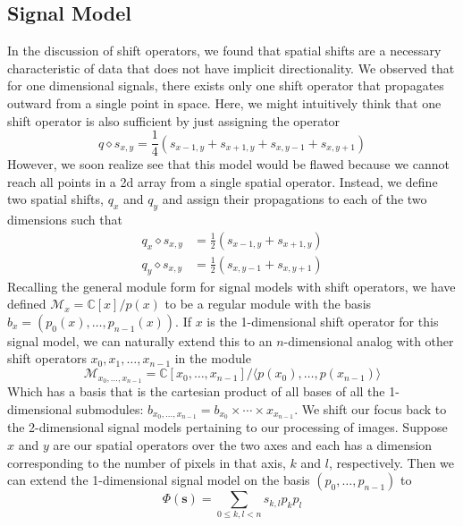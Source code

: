 \documentclass[12pt,technote]{IEEEtran}
\begin{document}
\subsection{Signal Model}
In the discussion of shift operators, we found that spatial shifts are a necessary characteristic of data that does not have implicit directionality. We observed that for one dimensional signals, there exists only one shift operator that propagates outward from a single point in space. Here, we might intuitively think that one shift operator is also sufficient by just assigning the operator
\begin{equation*}
    q \diamond s_{x,y} = \frac{1}{4}(s_{x-1,y} + s_{x+1,y} + s_{x,y-1} + s_{x,y+1})
\end{equation*}
However, we soon realize see that this model would be flawed because we cannot reach all points in a 2d array from a single spatial operator. Instead, we define two spatial shifts, $q_x$ and $q_y$ and assign their propagations to each of the two dimensions such that
\begin{align*}
    q_x \diamond s_{x,y} &= \frac{1}{2}(s_{x-1,y} + s_{x+1,y})\\
    q_y \diamond s_{x,y} &= \frac{1}{2}(s_{x,y-1} + s_{x,y+1})
\end{align*}
Recalling the general module form for signal models with shift operators, we have defined $\mathcal{M}_x = \mathbb{C}[x]/p(x)$ to be a regular module with the basis $b_x = (p_0(x), \dots, p_{n-1}(x))$. If $x$ is the 1-dimensional shift operator for this signal model, we can naturally extend this to an $n$-dimensional analog with other shift operators $x_0, x_1, \dots, x_{n-1}$ in the module
\begin{equation}
    \mathcal{M}_{x_0, \dots, x_{n-1}} = \mathbb{C}[x_0, \dots, x_{n-1}]/\langle p(x_0), \dots, p(x_{n-1})\rangle
\end{equation}
Which has a basis that is the cartesian product of all bases of all the 1-dimensional submodules: $b_{x_0, \dots, x_{n-1}} = b_{x_0}\times \cdots \times x_{x_{n-1}}$. We shift our focus back to the 2-dimensional signal models pertaining to our processing of images. Suppose $x$ and $y$ are our spatial operators over the two axes and each has a dimension corresponding to the number of pixels in that axis, $k$ and $l$, respectively. Then we can extend the 1-dimensional signal model on the basis $(p_0, \dots, p_{n-1})$ to
\begin{equation*}
    \Phi(\mathbf{s}) = \sum_{0\leq k,l <n}s_{k,l}p_kp_l
\end{equation*}
\end{document}
